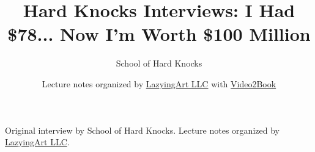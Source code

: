 \documentclass[11pt,oneside]{book}
\begin{document}
\frontmatter
\title{Hard Knocks Interviews: I Had \$78... Now I'm Worth \$100 Million}
\author{School of Hard Knocks}
\date{Lecture notes organized by \href{https://lazying.art}{LazyingArt LLC} with \href{https://github.com/lachlanchen/Video2Book}{Video2Book}}
\maketitle
\begin{center}
\small Original interview by School of Hard Knocks. Lecture notes organized by \href{https://lazying.art}{LazyingArt LLC}.
\end{center}
\clearpage
\mainmatter

\end{document}
